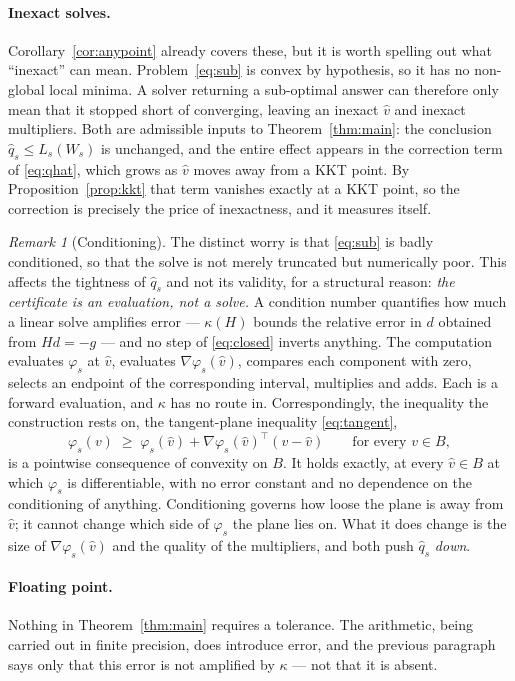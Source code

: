 \documentclass[11pt]{article}
\theoremstyle{plain}
\theoremstyle{remark}
\newtheorem{remark}[lemma]{Remark}
\newcommand{\W}{W}
\newcommand{\vhat}{\hat{v}}
\newcommand{\qhat}{\hat{q}}
\begin{document}
\paragraph{Inexact solves.}
Corollary~\ref{cor:anypoint} already covers these, but it is worth spelling out
what ``inexact'' can mean.  Problem~\eqref{eq:sub} is convex by hypothesis, so
it has no non-global local minima.  A solver returning a sub-optimal answer can
therefore only mean that it stopped short of converging, leaving an inexact
$\vhat$ and inexact multipliers.  Both are admissible inputs to
Theorem~\ref{thm:main}: the conclusion $\qhat_s \le L_s(\W_s)$ is unchanged, and
the entire effect appears in the correction term of \eqref{eq:qhat}, which grows
as $\vhat$ moves away from a KKT point.  By Proposition~\ref{prop:kkt} that term
vanishes exactly at a KKT point, so the correction is precisely the price of
inexactness, and it measures itself.

\begin{remark}[Conditioning]\label{rem:conditioning}
The distinct worry is that \eqref{eq:sub} is badly conditioned, so that the
solve is not merely truncated but numerically poor.  This affects the tightness
of $\qhat_s$ and not its validity, for a structural reason: \emph{the
certificate is an evaluation, not a solve.}  A condition number quantifies how
much a linear solve amplifies error --- $\kappa(H)$ bounds the relative error in
$d$ obtained from $Hd = -g$ --- and no step of \eqref{eq:closed} inverts
anything.  The computation evaluates $\varphi_s$ at $\vhat$, evaluates
$\nabla \varphi_s(\vhat)$, compares each component with zero, selects an
endpoint of the corresponding interval, multiplies and adds.  Each is a forward
evaluation, and $\kappa$ has no route in.  Correspondingly, the inequality the
construction rests on, the tangent-plane inequality \eqref{eq:tangent},
\[
  \varphi_s(v) \;\ge\; \varphi_s(\vhat)
                     + \nabla \varphi_s(\vhat)^{\top} (v - \vhat)
  \qquad \text{for every } v \in B,
\]
is a pointwise consequence of convexity on $B$.  It holds exactly, at every
$\vhat \in B$ at which $\varphi_s$ is differentiable, with no error constant and no dependence on the conditioning of anything.
Conditioning governs how loose the plane is away from $\vhat$; it cannot change
which side of $\varphi_s$ the plane lies on.  What it does change is the size of
$\nabla \varphi_s(\vhat)$ and the quality of the multipliers, and both push
$\qhat_s$ \emph{down}.
\end{remark}

\paragraph{Floating point.}
Nothing in Theorem~\ref{thm:main} requires a tolerance.  The arithmetic, being
carried out in finite precision, does introduce error, and the previous
paragraph says only that this error is not amplified by $\kappa$ --- not that it
is absent.
\end{document}
